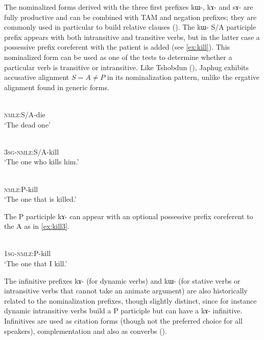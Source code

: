 \documentclass[oldfontcommands,oneside,a4paper,11pt]{article}
\newcommand{\ipa}[1]{{\phon \mbox{#1}}} %
\begin{document}
 The nominalized forms derived with the three first prefixes \ipa{kɯ-}, \ipa{kɤ}- and \ipa{sɤ}- are fully productive and can be combined with TAM and negation prefixes; they are commonly used in particular to build relative clauses (\citealt{jacques16relatives}).  The \ipa{kɯ-} S/A participle prefix appears with both intransitive and transitive verbs, but in the latter case a possessive prefix  coreferent with the patient is added (see \ref{ex:kill}). This nominalized form can be used as one of the tests to determine whether a particular verb is transitive or intransitive. Like Tshobdun (\citealt{jackson03caodeng}),  Japhug exhibits accusative alignment $S=A\neq P$ in its nominalization pattern, unlike the ergative alignment found in generic forms. 

 \begin{exe}
\ex \label{ex:die}
\gll \ipa{kɯ-si}    \\
  \textsc{nmlz}:S/A-die \\
 \glt  `The dead one'
 
\ex \label{ex:kill}
\gll \ipa{ɯ-kɯ-sat}    \\
  \textsc{3sg}-\textsc{nmlz}:S/A-kill \\
 \glt  `The one who kills him.'
 

\ex \label{ex:kill2}
\gll \ipa{kɤ-sat}    \\
   \textsc{nmlz}:P-kill \\
 \glt  `The one that is killed.'
 \end{exe}
 
  The P participle \ipa{kɤ-} can appear with an optional possessive prefix coreferent to the A as in \ref{ex:kill3}.
  
  \begin{exe}
\ex \label{ex:kill3}
\gll \ipa{a-kɤ-sat}    \\
   \textsc{1sg-nmlz}:P-kill \\
 \glt  `The one that I kill.'
 \end{exe} 
 
The infinitive prefixes  \ipa{kɤ-} (for dynamic verbs) and \ipa{kɯ-} (for stative verbs or intransitive verbs that cannot take an animate argument) are also historically related to the nominalization prefixes, though slightly distinct, since for instance dynamic intransitive verbs build a P participle but can have a \ipa{kɤ-} infinitive. Infinitives are used as citation forms (though not the preferred choice for all speakers), complementation and also as converbs (\citealt{jacques14linking}).
 
\end{document}
